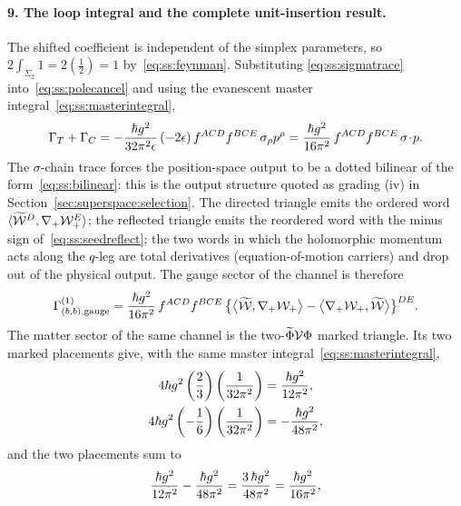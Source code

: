 \paragraph{9. The loop integral and the complete unit-insertion result.}
The shifted coefficient is independent of the simplex parameters, so
$2\int_{\Sigma_2}1=2(\tfrac12)=1$ by~\eqref{eq:ss:feynman}. Substituting
\eqref{eq:ss:sigmatrace} into~\eqref{eq:ss:polecancel} and using the
evanescent master integral~\eqref{eq:ss:masterintegral},
\begin{equation}\label{eq:ss:seedfinal}
\Gamma_{T}+\Gamma_{C}
=-\frac{\hbar g^{2}}{32\pi^{2}\epsilon}\,(-2\epsilon)\,
f^{ACD}f^{BCE}\,\sigma_\rho p^{\rho}
=\frac{\hbar g^{2}}{16\pi^{2}}\,
f^{ACD}f^{BCE}\,\sigma\!\cdot\!p .
\end{equation}
The $\sigma$-chain trace forces the position-space output to be a dotted
bilinear of the form~\eqref{eq:ss:bilinear}: this is the output structure
quoted as grading (iv) in Section~\ref{sec:superspace:selection}. The
directed triangle emits the ordered word
$\langle\widetilde{\mathcal{W}}^{D},\nabla_{+}\mathcal{W}_{+}^{E}\rangle$; the reflected triangle emits
the reordered word with the minus sign of~\eqref{eq:ss:seedreflect}; the two
words in which the holomorphic momentum acts along the $q$-leg are total
derivatives (equation-of-motion carriers) and drop out of the physical
output. The gauge sector of the channel is therefore
\begin{equation}\label{eq:ss:seedgauge}
\Gamma^{(1)}_{(b,b),\mathrm{gauge}}
=\frac{\hbar g^{2}}{16\pi^{2}}\,f^{ACD}f^{BCE}\,
\big\{\big\langle\widetilde{\mathcal{W}},\nabla_{+}\mathcal{W}_{+}\big\rangle
-\big\langle\nabla_{+}\mathcal{W}_{+},\widetilde{\mathcal{W}}\big\rangle\big\}^{DE} .
\end{equation}
The matter sector of the same channel is the two-$\widetilde\Phi\mathcal{V}\Phi$
marked triangle. Its two marked placements give, with the same master
integral~\eqref{eq:ss:masterintegral},
\begin{align}
4\hbar g^{2}\left(\frac23\right)\left(\frac{1}{32\pi^{2}}\right)
&=\frac{\hbar g^{2}}{12\pi^{2}},
\label{eq:ss:seedmatterone}\\
4\hbar g^{2}\left(-\frac16\right)\left(\frac{1}{32\pi^{2}}\right)
&=-\frac{\hbar g^{2}}{48\pi^{2}},
\label{eq:ss:seedmattertwo}
\end{align}
and the two placements sum to
\begin{equation}\label{eq:ss:seedmatternet}
\frac{\hbar g^{2}}{12\pi^{2}}-\frac{\hbar g^{2}}{48\pi^{2}}
=\frac{3\,\hbar g^{2}}{48\pi^{2}}
=\frac{\hbar g^{2}}{16\pi^{2}},
\end{equation}
